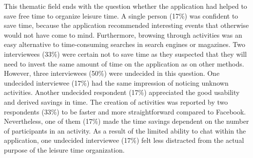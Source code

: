 \documentclass[12pt,numbers=noenddot,parskip,bibliography=totocnumbered,listof=totocnumbered,draft]{scrreprt}
\begin{document}
This thematic field ends with the question whether the application had helped to save free time to organize leisure time. A single person (17\%) was confident to save time, because the application recommended interesting events that otherwise would not have come to mind. Furthermore, browsing through activities was an easy alternative to time-consuming searches in search engines or magazines. Two interviewees (33\%) were certain not to save time as they suspected that they will need to invest the same amount of time on the application as on other methods. However, three interviewees (50\%) were undecided in this question. One undecided interviewee (17\%) had the same impression of noticing unknown activities. Another undecided respondent (17\%) appreciated the good usability and derived savings in time. The creation of activities was reported by two respondents (33\%) to be faster and more straightforward compared to Facebook. Nevertheless, one of them (17\%) made the time savings dependent on the number of participants in an activity. As a result of the limited ability to chat within the application, one undecided interviewee (17\%) felt less distracted from the actual purpose of the leisure time organization.
\end{document}
